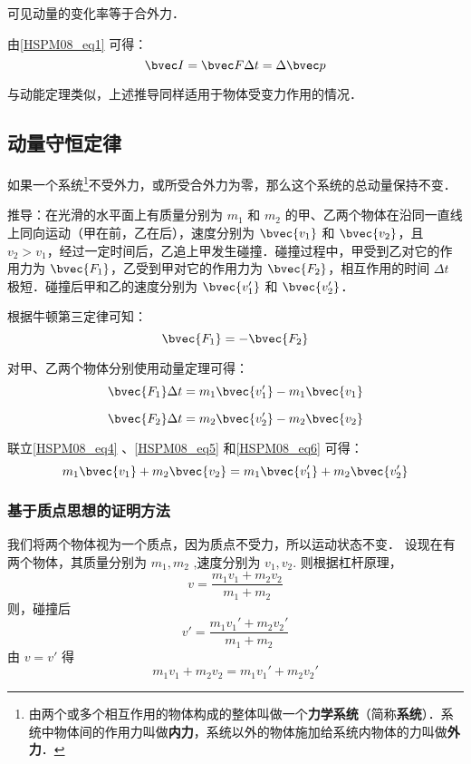 可见动量的变化率等于合外力．

由\autoref{HSPM08_eq1} 可得：
\begin{equation}\label{HSPM08_eq3}
\bvec I=\bvec F\Delta t=\Delta \bvec p
\end{equation}

与动能定理类似，上述推导同样适用于物体受变力作用的情况．

\subsection{动量守恒定律}

如果一个系统\footnote{由两个或多个相互作用的物体构成的整体叫做一个\textbf{力学系统}（简称\textbf{系统}）．系统中物体间的作用力叫做\textbf{内力}，系统以外的物体施加给系统内物体的力叫做\textbf{外力}．}不受外力，或所受合外力为零，那么这个系统的总动量保持不变．

推导：在光滑的水平面上有质量分别为 $m_1$ 和 $m_2$ 的甲、乙两个物体在沿同一直线上同向运动（甲在前，乙在后），速度分别为 $\bvec{v_1}$ 和 $\bvec{v_2}$，且 $v_2>v_1$，经过一定时间后，乙追上甲发生碰撞．碰撞过程中，甲受到乙对它的作用力为 $\bvec {F_1}$，乙受到甲对它的作用力为 $\bvec {F_2}$，相互作用的时间 $\Delta t$ 极短．碰撞后甲和乙的速度分别为 $\bvec{v_1'}$ 和 $\bvec{v_2'}$．

根据牛顿第三定律可知：
\begin{equation}\label{HSPM08_eq4}
\bvec {F_1}=-\bvec{F_2}
\end{equation}

对甲、乙两个物体分别使用动量定理可得：
\begin{equation}\label{HSPM08_eq5}
\bvec{F_1}\Delta t=m_1\bvec{v_1'}-m_1\bvec{v_1}
\end{equation}

\begin{equation}\label{HSPM08_eq6}
\bvec{F_2}\Delta t=m_2\bvec{v_2'}-m_2\bvec{v_2}
\end{equation}

联立\autoref{HSPM08_eq4} 、\autoref{HSPM08_eq5} 和\autoref{HSPM08_eq6} 可得：
\begin{equation}
m_1\bvec{v_1}+ m_2\bvec{v_2}= m_1\bvec{v_1'}+ m_2\bvec{v_2'}
\end{equation}

\subsubsection{基于质点思想的证明方法}
我们将两个物体视为一个质点，因为质点不受力，所以运动状态不变．
设现在有两个物体，其质量分别为 $m_1,m_2$ ,速度分别为 $v_1,v_2$.
则根据杠杆原理，
\begin{equation}
v = \frac{m_1v_1 + m_2v_2}{m_1+m_2}
\end{equation}
则，碰撞后
\begin{equation}
v' = \frac{m_1v_1' + m_2v_2'}{m_1+m_2}
\end{equation}
由 $v = v'$ 得
\begin{equation}
m_1v_1 + m_2v_2 = m_1v_1' + m_2v_2'
\end{equation}



